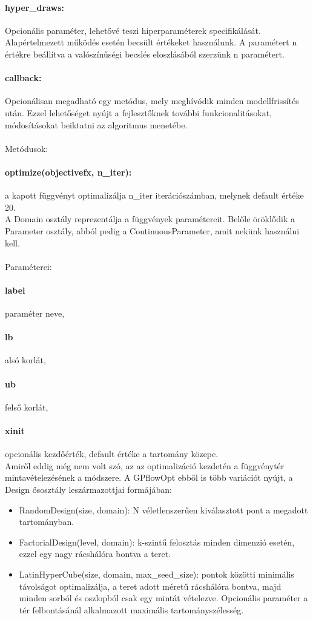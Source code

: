 \paragraph{hyper\_draws:} Opcionális paraméter, lehetővé teszi hiperparaméterek specifikálását. Alapértelmezett működés esetén becsült értékeket használunk. A paramétert n értékre beállítva a valószínűségi becslés eloszlásából %
szerzünk n paramétert.
\paragraph{callback:} Opcionálisan megadható egy metódus, mely meghívódik minden modellfrissítés után. Ezzel lehetőséget nyújt a fejlesztőknek további funkcionalitásokat, módosításokat beiktatni az algoritmus menetébe.\\\\
Metódusok:
\paragraph{optimize(objectivefx, n\_iter):} a kapott függvényt optimalizálja n\_iter iterációszámban, melynek default értéke 20.\\

A Domain osztály reprezentálja a függvények paramétereit. Belőle öröklődik a Parameter osztály, abból pedig a ContinuousParameter, amit nekünk használni kell.\\\\
Paraméterei:
\paragraph{label} paraméter neve,
\paragraph{lb} alsó korlát,
\paragraph{ub} felső korlát,
\paragraph{xinit} opcionális kezdőérték, default értéke a tartomány közepe.\\

Amiről eddig még nem volt szó, az az optimalizáció kezdetén a függvénytér mintavételezésének a módszere. A GPflowOpt ebből is több variációt nyújt, a Design ősosztály leszármazottjai formájában: 
\begin{itemize}
	\item RandomDesign(size, domain): N véletlenszerűen kiválasztott pont a megadott tartományban.
	\item FactorialDesign(level, domain): k-szintű felosztás minden dimenzió esetén, ezzel egy nagy rácshálóra bontva a teret.
	\item LatinHyperCube(size, domain, max\_seed\_size): pontok közötti minimális távolságot optimalizálja, a teret adott méretű rácshálóra bontva, majd minden sorból és oszlopból csak egy mintát vételezve. Opcionális paraméter a tér felbontásánál alkalmazott maximális tartományszélesség.
\end{itemize}

